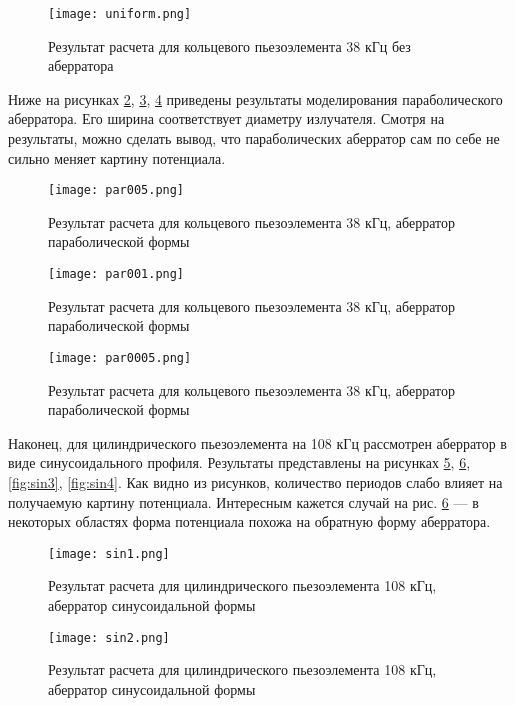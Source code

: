 \begin{figure}[H]
	\centering
	\texttt{[image: uniform.png]}
	\caption{Результат расчета для кольцевого пьезоэлемента 38 кГц без аберратора}
	\label{fig:uniform}
\end{figure}

Ниже на рисунках \ref{fig:par005}, \ref{fig:par001}, \ref{fig:par0005} приведены результаты моделирования параболического аберратора. Его ширина соответствует диаметру излучателя. Смотря на результаты, можно сделать вывод, что параболических аберратор сам по себе не сильно меняет картину потенциала.

\begin{figure}[H]
	\centering
	\texttt{[image: par005.png]}
	\caption{Результат расчета для кольцевого пьезоэлемента 38 кГц, аберратор параболической формы}
	\label{fig:par005}
\end{figure} 

\begin{figure}[H]
	\centering
	\texttt{[image: par001.png]}
	\caption{Результат расчета для кольцевого пьезоэлемента 38 кГц, аберратор параболической формы}
	\label{fig:par001}
\end{figure} 

\begin{figure}[H]
	\centering
	\texttt{[image: par0005.png]}
	\caption{Результат расчета для кольцевого пьезоэлемента 38 кГц, аберратор параболической формы}
	\label{fig:par0005}
\end{figure}

Наконец, для цилиндрического пьезоэлемента на 108 кГц рассмотрен аберратор в виде синусоидального профиля. Результаты представлены на рисунках \ref{fig:sin1}, \ref{fig:sin2}, \ref{fig:sin3}, \ref{fig:sin4}. Как видно из рисунков, количество периодов слабо влияет на получаемую картину потенциала. Интересным кажется случай на рис. \ref{fig:sin2} --- в некоторых областях форма потенциала похожа на обратную форму аберратора.

\begin{figure}[H]
	\centering
	\texttt{[image: sin1.png]}
	\caption{Результат расчета для цилиндрического пьезоэлемента 108 кГц, аберратор синусоидальной формы}
	\label{fig:sin1}
\end{figure} 

\begin{figure}[H]
	\centering
	\texttt{[image: sin2.png]}
	\caption{Результат расчета для цилиндрического пьезоэлемента 108 кГц, аберратор синусоидальной формы}
	\label{fig:sin2}
\end{figure} 


